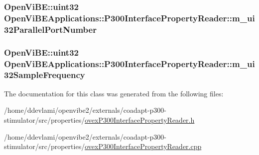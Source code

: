 \label{classOpenViBEApplications_1_1P300InterfacePropertyReader_ab4c591e47a187c3e12043ff580f159d2}
\hypertarget{classOpenViBEApplications_1_1P300InterfacePropertyReader_a59338ebef691060a96b2a18f3a6a11b6}{
\subsubsection[{m\_\-ui32ParallelPortNumber}]{\setlength{\rightskip}{0pt plus 5cm}OpenViBE::uint32 {\bf OpenViBEApplications::P300InterfacePropertyReader::m\_\-ui32ParallelPortNumber}}}
\label{classOpenViBEApplications_1_1P300InterfacePropertyReader_a59338ebef691060a96b2a18f3a6a11b6}
\hypertarget{classOpenViBEApplications_1_1P300InterfacePropertyReader_ae9ff03911a4fea4317d39dd91a6250fb}{
\subsubsection[{m\_\-ui32SampleFrequency}]{\setlength{\rightskip}{0pt plus 5cm}OpenViBE::uint32 {\bf OpenViBEApplications::P300InterfacePropertyReader::m\_\-ui32SampleFrequency}}}
\label{classOpenViBEApplications_1_1P300InterfacePropertyReader_ae9ff03911a4fea4317d39dd91a6250fb}


The documentation for this class was generated from the following files:\begin{DoxyCompactItemize}
\item 
/home/ddevlami/openvibe2/externals/coadapt-\/p300-\/stimulator/src/properties/\hyperlink{ovexP300InterfacePropertyReader_8h}{ovexP300InterfacePropertyReader.h}\item 
/home/ddevlami/openvibe2/externals/coadapt-\/p300-\/stimulator/src/properties/\hyperlink{ovexP300InterfacePropertyReader_8cpp}{ovexP300InterfacePropertyReader.cpp}\end{DoxyCompactItemize}

